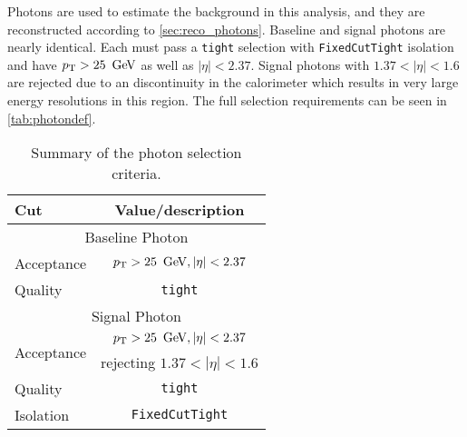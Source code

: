 Photons are used to estimate the \dyjets background in this analysis, and they are reconstructed according to \autoref{sec:reco_photons}. Baseline and signal photons are nearly identical. Each must pass a \texttt{tight} selection with \texttt{FixedCutTight} isolation and have $\pt > 25\,\GeV$ as well as $|\eta| < 2.37$. Signal photons with $1.37<|\eta|<1.6$ are rejected due to an discontinuity in the calorimeter which results in very large energy resolutions in this region. The full selection requirements can be seen in \autoref{tab:photondef}.

\begin{table}[ph!]
  \begin{center}
    \begin{tabular}{l|c}
      \hline
      Cut            & Value/description \\
      \hline
      \hline
      \multicolumn{2}{c}{Baseline Photon}\\
      \hline
      Acceptance        & $\pt > 25\,\GeV, |\eta| < 2.37$   \\
      Quality        & \texttt{tight}    \\
      \hline
      \multicolumn{2}{c}{Signal Photon}\\
      \hline
      \multirow{2}{*}{Acceptance}     & $\pt > 25\,\GeV, |\eta| < 2.37$ \\
                     & rejecting $1.37<|\eta|<1.6$\\
      Quality        & \texttt{tight}    \\
      Isolation        & \texttt{FixedCutTight} \\
      \hline      
      \hline
    \end{tabular}
  \caption{Summary of the photon selection criteria.}            
    \label{tab:photondef}
  \end{center}
\end{table}

